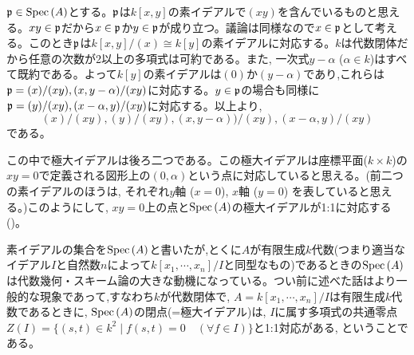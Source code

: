 \begin{egans}
$\mathfrak{p}\in \mathrm{Spec}\left( A \right)$とする。$\mathfrak{p}$は$k[x,y]$の素イデアルで$(xy)$を含んでいるものと思える。$xy\in \mathfrak{p}$だから$x\in \mathfrak{p}$か$y\in \mathfrak{p}$が成り立つ。議論は同様なので$x\in \mathfrak{p}$として考える。このとき$\mathfrak{p}$は$k[x,y]/(x)\cong k[y]$の素イデアルに対応する。$k$は代数閉体だから任意の次数が2以上の多項式は可約である。また, 一次式$y-\alpha$ ($\alpha\in k$)はすべて既約である。よって$k[y]$の素イデアルは$(0)$か$(y-\alpha)$であり,これらは $\mathfrak{p} = (x)/(xy), (x,y-\alpha)/(xy)$に対応する。$y\in \mathfrak{p}$の場合も同様に$\mathfrak{p}=(y)/(xy), (x-\alpha, y)/(xy)$に対応する。以上より,
\[(x)/(xy), (y)/(xy), (x,y-\alpha))/(xy), (x-\alpha, y)/(xy)\]
である。
\end{egans}
\begin{rem}
この中で極大イデアルは後ろ二つである。この極大イデアルは座標平面($k\times k$)の$xy=0$で定義される図形上の$(0,\alpha)$という点に対応していると思える。(前二つの素イデアルのほうは, それぞれ$y$軸 ($x=0$), $x$軸 ($y=0$) を表していると思える。)このようにして, $xy=0$上の点と$\mathrm{Spec}\left( A \right)$の極大イデアルが1:1に対応する()。

素イデアルの集合を$\mathrm{Spec}\left( A \right)$と書いたが,とくに$A$が有限生成$k$代数(つまり適当なイデアル$I$と自然数$n$によって$k[x_1,\cdots, x_n]/I$と同型なもの)であるときの$\mathrm{Spec}\left( A \right)$は代数幾何・スキーム論の大きな動機になっている。つい前に述べた話はより一般的な現象であって,すなわち$k$が代数閉体で, $A= k[x_1,\cdots,x_n]/I$は有限生成$k$代数であるときに, $\mathrm{Spec}\left( A \right)$の閉点(=極大イデアル)は, $I$に属す多項式の共通零点$Z(I) = \{ (s,t)\in k^2 \mid f(s,t)= 0 \quad (\forall f\in I) \}$と1:1対応がある, ということである。
\end{rem}


